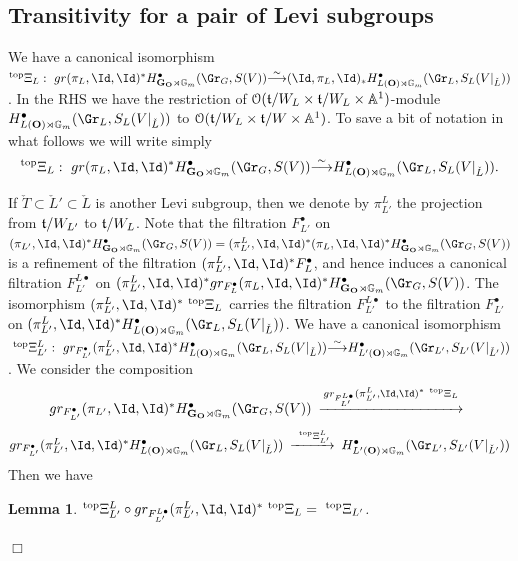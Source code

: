 \documentclass[11pt]{amsart}
\newtheorem{lem}{Lemma}
\theoremstyle{definition}
\theoremstyle{remark}
\renewcommand{\O}{{\mathcal O}}
\theoremstyle{remark}
\newcommand{\cal}{\mathcal}
\newcommand{\iso}{{\stackrel{\sim}{\longrightarrow}}}
\newcommand{\<}{\langle}
\renewcommand{\>}{\rangle}
\renewcommand{\t}{{\frak t}}
\newcommand{\LL}{\check{L}{}}
\newcommand{\LT}{\check{T}{}}
\renewcommand{\O}{{\cal O}}
\newcommand{\GO}{{\bf G_O}}
\newcommand{\Aone}{{\mathbb A}^1}
\newcommand{\Gm}{{{\mathbb G}_m}}
\begin{document}
\subsection{Transitivity for a pair of Levi subgroups}
\label{toppair}
We have a canonical isomorphism
$^{\operatorname{top}}\Xi_L:\ 
gr(\pi_L,\Id,\Id)^*H^\bullet_{\GO\rtimes\Gm}(\Gr_G,S(V))
\iso(\Id,\pi_L,\Id)_*
H^\bullet_{L({\mathbf O})\rtimes\Gm}(\Gr_L,S_L(V|_{\LL}))$. 
In the RHS we have the restriction of 
$\O(\t/W_L\times\t/W_L\times\Aone)$-module
$H^\bullet_{L({\mathbf O})\rtimes\Gm}(\Gr_L,S_L(V|_{\LL}))$ to
$\O(\t/W_L\times\t/W\times\Aone)$. To save a bit of notation in what 
follows we will write simply
$$^{\operatorname{top}}\Xi_L:\ 
gr(\pi_L,\Id,\Id)^*H^\bullet_{\GO\rtimes\Gm}(\Gr_G,S(V))
\iso H^\bullet_{L({\mathbf O})\rtimes\Gm}(\Gr_L,S_L(V|_{\LL})).$$

If $\LT\subset\LL'\subset\LL$
is another Levi subgroup, then we denote by $\pi_{L'}^L$ the projection
from $\t/W_{L'}$ to $\t/W_L$. Note that the filtration $F_{L'}^\bullet$
on $(\pi_{L'},\Id,\Id)^*H^\bullet_{\GO\rtimes\Gm}(\Gr_G,S(V))=
(\pi_{L'}^L,\Id,\Id)^*(\pi_L,\Id,\Id)^*H^\bullet_{\GO\rtimes\Gm}(\Gr_G,S(V))$
is a refinement of the filtration $(\pi_{L'}^L,\Id,\Id)^*F_L^\bullet$,
and hence induces a canonical filtration $F_{L'}^{L\bullet}$ on
$(\pi_{L'}^L,\Id,\Id)^*gr_{F_L^\bullet}(\pi_L,\Id,\Id)^*
H^\bullet_{\GO\rtimes\Gm}(\Gr_G,S(V))$. The isomorphism
$(\pi_{L'}^L,\Id,\Id)^*\ ^{\operatorname{top}}\Xi_L$ carries the filtration $F_{L'}^{L\bullet}$
to the filtration $F_{L'}^\bullet$ on
$(\pi_{L'}^L,\Id,\Id)^*
H^\bullet_{L({\mathbf O})\rtimes\Gm}(\Gr_L,S_L(V|_{\LL}))$.
We have a canonical isomorphism
$\ ^{\operatorname{top}}\Xi_{L'}^L:\ gr_{F_{L'}^\bullet}(\pi_{L'}^L,\Id,\Id)^*
H^\bullet_{L({\mathbf O})\rtimes\Gm}(\Gr_L,S_L(V|_{\LL}))\iso
H^\bullet_{L'({\mathbf O})\rtimes\Gm}(\Gr_{L'},S_{L'}(V|_{\LL'}))$.
We consider the composition
\begin{equation}
\begin{CD} 
gr_{F_{L'}^\bullet}(\pi_{L'},\Id,\Id)^*H^\bullet_{\GO\rtimes\Gm}(\Gr_G,S(V))
@>gr_{F_{L'}^{L\bullet}}(\pi_{L'}^L,\Id,\Id)^*\ ^{\operatorname{top}}\Xi_L>>
\end{CD}
\end{equation}
$$\begin{CD}
gr_{F_{L'}^\bullet}(\pi_{L'}^L,\Id,\Id)^*
H^\bullet_{L({\mathbf O})\rtimes\Gm}(\Gr_L,S_L(V|_{\LL}))
@>\ ^{\operatorname{top}}\Xi_{L'}^L>>
H^\bullet_{L'({\mathbf O})\rtimes\Gm}(\Gr_{L'},S_{L'}(V|_{\LL'}))
\end{CD}$$
Then we have
\begin{lem}
\label{tp}
$^{\operatorname{top}}\Xi_{L'}^L\circ gr_{F_{L'}^{L\bullet}}
(\pi_{L'}^L,\Id,\Id)^*\ ^{\operatorname{top}}\Xi_L=\ 
^{\operatorname{top}}\Xi_{L'}$.
\end{lem}
\hfill $\Box$
\end{document}
